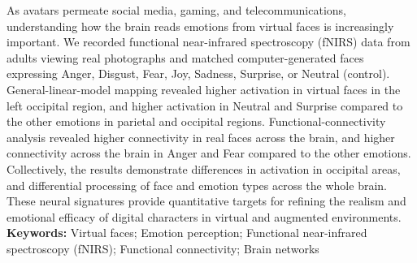 As avatars permeate social media, gaming, and telecommunications, understanding how the brain reads emotions from virtual faces is increasingly important. 
We recorded functional near-infrared spectroscopy (fNIRS) data from adults viewing real photographs and matched computer-generated faces expressing Anger, Disgust, Fear, Joy, Sadness, Surprise, or Neutral (control). 
General-linear-model mapping revealed higher activation in virtual faces in the left occipital region, and higher activation in Neutral and Surprise compared to the other emotions in parietal and occipital regions. 
Functional-connectivity analysis revealed higher connectivity in real faces across the brain, and higher connectivity across the brain in Anger and Fear compared to the other emotions. 
Collectively, the results demonstrate differences in activation in occipital areas, and differential processing of face and emotion types across the whole brain.  
These neural signatures provide quantitative targets for refining the realism and emotional efficacy of digital characters in virtual and augmented environments.
\vfill
\textbf{Keywords:} Virtual faces; Emotion perception; Functional near-infrared spectroscopy (fNIRS); Functional connectivity; Brain networks